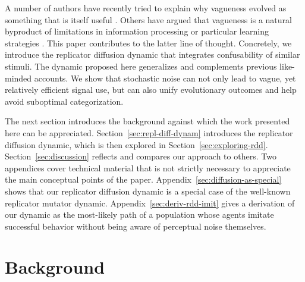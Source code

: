 \documentclass[fleqn,reqno,10pt]{article}
\begin{document}
A number of authors have recently tried to explain why vagueness evolved as something that is
itself useful
\citep[e.g.][]{Jaegherde-Jaegher2003:A-Game-Theoreti,Deemter2009:Utility-and-Lan,BlumeBoard2013:Intentional-Vag}.
Others have argued that vagueness is a natural byproduct of limitations in information
processing or particular learning strategies
\citep[e.g.][]{FrankeJager2010:Vagueness-Signa,OConnor2013:The-Evolution-o}. This paper
contributes to the latter line of thought. Concretely, we introduce the replicator diffusion
dynamic that integrates confusability of similar stimuli. The dynamic proposed here generalizes
and complements previous like-minded accounts. We show that stochastic noise can not only lead
to vague, yet relatively efficient signal use, but can also unify evolutionary outcomes and
help avoid suboptimal categorization.

The next section introduces the background against which the work presented here can be
appreciated. Section~\ref{sec:repl-diff-dynam} introduces the replicator diffusion dynamic,
which is then explored in Section~\ref{sec:exploring-rdd}.  Section~\ref{sec:discussion}
reflects and compares our approach to others. Two appendices cover technical material that is
not strictly necessary to appreciate the main conceptual points of the paper.
Appendix~\ref{sec:diffusion-as-special} shows that our replicator diffusion dynamic is a
special case of the well-known replicator mutator dynamic. Appendix~\ref{sec:deriv-rdd-imit}
gives a derivation of our dynamic as the most-likely path of a population whose agents imitate
successful behavior without being aware of perceptual noise themselves.

\section{Background}
\label{sec:background}

\end{document}
